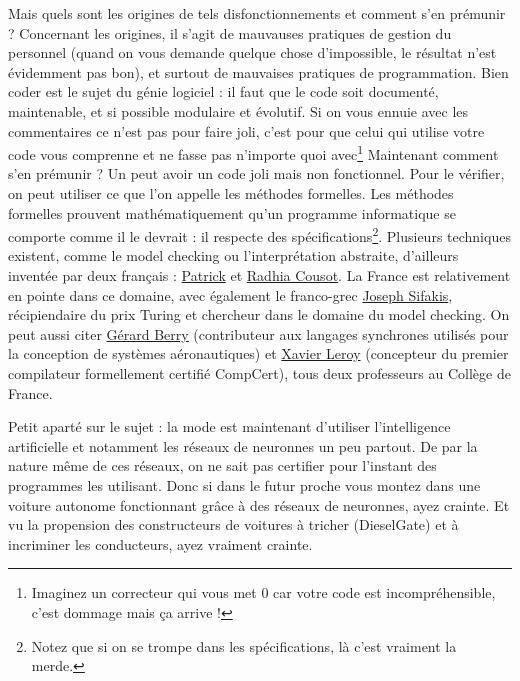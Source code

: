 \documentclass[10pt]{article}
\begin{document}
Mais quels sont les origines de tels disfonctionnements et comment s'en prémunir ? Concernant les origines, il s'agit de mauvauses pratiques de gestion du
personnel (quand on vous demande quelque chose d'impossible, le résultat n'est évidemment pas bon), et surtout de mauvaises pratiques de programmation.
Bien coder est le sujet du génie logiciel : il faut que le code soit documenté, maintenable, et si possible modulaire et évolutif. Si on vous ennuie
avec les commentaires ce n'est pas pour faire joli, c'est pour que celui qui utilise votre code vous comprenne et ne fasse pas n'importe quoi avec\footnote{
  Imaginez un correcteur qui vous met $0$ car votre code est incompréhensible, c'est dommage mais ça arrive !
} Maintenant comment s'en prémunir ? Un peut avoir un code joli mais non fonctionnel. Pour le vérifier, on peut utiliser ce que l'on appelle les méthodes formelles.
Les méthodes formelles prouvent mathématiquement qu'un programme informatique se comporte comme il le devrait : il respecte des spécifications\footnote{
  Notez que si on se trompe dans les spécifications, là c'est vraiment la merde.}. Plusieurs techniques existent, comme le model checking ou l'interprétation
abstraite, d'ailleurs inventée par deux français : \href{https://fr.wikipedia.org/wiki/Patrick_Cousot}{Patrick} et
\href{https://fr.wikipedia.org/wiki/Radhia_Cousot}{Radhia Cousot}. La France est relativement en pointe dans ce domaine, avec également le franco-grec
\href{https://fr.wikipedia.org/wiki/Joseph_Sifakis}{Joseph Sifakis}, récipiendaire du prix Turing et chercheur dans le domaine du model checking.
On peut aussi citer \href{https://fr.wikipedia.org/wiki/G\%C3\%A9rard_Berry}{Gérard Berry} (contributeur aux langages synchrones utilisés
pour la conception de systèmes aéronautiques) et \href{https://fr.wikipedia.org/wiki/Xavier_Leroy}{Xavier Leroy} (concepteur du premier compilateur
formellement certifié CompCert), tous deux professeurs au Collège de France.

Petit aparté sur le sujet : la mode est maintenant d'utiliser l'intelligence artificielle et notamment les réseaux de neuronnes un peu partout.
De par la nature même de ces réseaux, on ne sait pas certifier pour l'instant des programmes les utilisant. Donc si dans le futur proche vous
montez dans une voiture autonome fonctionnant grâce à des réseaux de neuronnes, ayez crainte. Et vu la propension des constructeurs de voitures
à tricher (DieselGate) et à incriminer les conducteurs, ayez vraiment crainte.
\end{document}
